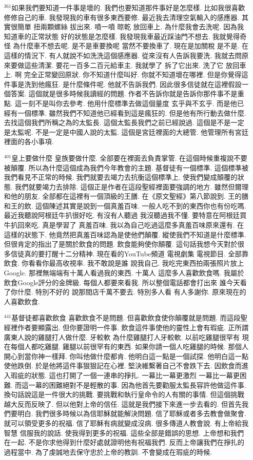 \documentclass{book}
\begin{document}
$^{361}$如果我們要知道一件事是壞的.
我們也要知道那件事好是怎麼樣.
比如我很喜歡修修自己的車.
我發現我的車有很多東西要修.
最近我去清理空氣輸入的感應器.
其實很簡單 扭兩顆螺絲 拔出來.
噴一噴 晾乾 放回車上.
為什麼我會去洗呢.
因為我知道車的正常狀態 好的狀態是怎麼樣.
我發現我車最近踩油門不想去.
我就覺得奇怪 為什麼車不想去呢.
是不是車要換呢 當然不要換車了.
現在是加關稅 是不是.
在這樣的情況下.
有人就說不如洗洗這個感應器.
從來沒有人告訴我要洗.
我就去問原來要做這些清潔.
要花一百多二百元給車主.
我就學了 拆了它出來.
洗了它 放回車上.
啊 完全正常變回原狀.
你不知道什麼叫好.
你就不知道壞在哪裡.
但是你覺得這件事是洗到他瘋狂.
是什麼條件呢.
他就不告訴我們.
因此很多信徒就在這裡假設一個答案.
這個就是很多時候我讀經的問題.
作者不告訴你就是告訴你那件事不是重點.
這一刻不是叫你去參考.
他用什麼標準去做這個量度 玄乎與不玄乎.
而是他已經有一個標準.
雖然我們不知道他已經看到這是瘋狂的.
但是他有所行動去做什麼.
去找這個我們所稱之為的太監長.
這個太監長我們之前已經說過.
這個是不是一定是太監呢.
不是一定是中國人說的太監.
這個是宮廷裡面的大總管.
他管理所有宮廷裡面的各小事項.

$^{401}$皇上要做什麼 皇族要做什麼.
全部要在裡面去負責掌管.
在這個時候重複說不要被顛覆.
所以為什麼這個成為我們今年教會的主題.
基督徒有一個標準.
這個標準被我們看見不正常的時候.
我們就要去竭力去抗衡這個標準上.
使我們變成顛覆的狀態.
我們就要竭力去排除.
這個正是作者在這段聖經裡面要強調的地方.
雖然但爾理和他的朋友.
全部都在這裡有一個頂級的王膳.
在《原文聖經》第八節說到.
王的膳和王的飲.
這個陳述其實是說到一個真羞百味.
一般人吃不到的東西你也有份吃嗎.
最近我聽說阿根廷牛扒很好吃.
有沒有人聽過 我沒聽過我不懂.
要特意在阿根廷買牛扒回來吃.
真是學習了 真羞百味.
我以為自己吃過這麼多真羞百味原來還有.
在這樣的狀態下.
他竟然把真羞百味認為是使他們顛覆.
縱使我們不知道是什麼標準.
但很肯定的指出了是關於飲食的問題.
飲食能夠使你顛覆.
這句話我想今天對於很多信徒真的要打醒十二分精神.
現在看的YouTube頻道 電視劇集 電視節目.
全部靠飲食.
你看看你最高收視率.
我不敢說是誰 說我自己.
我吃完東西拍兩張照片放上Google.
那裡無端端有十萬人看過我的東西.
十萬人 這麼多人喜歡飲食嗎.
我屬於飲食Google評分的金牌級.
每個人都要來看我.
所以整個電話都會打出來 誰今天看了你什麼.
特別不好的 說那間店千萬不要去.
特別多人看 有人多謝你.
原來現在的人喜歡飲食.

$^{441}$基督徒都喜歡飲食 喜歡飲食不是問題.
但喜歡飲食使你顛覆就是問題.
而這段聖經裡作者要顯露出.
但你要證明一件事.
飲食這件事使他的靈性上會有瑕疵.
正所謂廣東人說的雞腿打人做什麼.
牙較軟 為什麼雞腿打人牙較軟.
以前吃雞腿很罕有 現在每個人都吃雞腿.
雞腿以前很罕有的東西.
如果你請一個人吃雞腿的時候.
那個人開心到當你神一樣拜.
你叫他做什麼都肯.
他明白這一點是一個試探.
他明白這一點使他跌倒.
於是他將這件事狠狠記在心裡.
堅決維繫著自己不會跌下去.
因飲食而進入瑕疵的狀態.
這也打開了一個一連串的掙扎.
一幕比一幕更激烈 一幕比一幕更困難.
而這一幕的困難絕對不是輕散的事.
因為他首先要勸服太監長容許他做這件事.
換句話說這是一件很大的挑戰.
要挑戰和執行皇命令的人有關的事情.
但這個挑戰越大反而反映了.
但以他對上帝的信任.
這就是我們接下來進一步去看的.
但首先我們要明白.
我們很多時候以為信耶穌就能解決問題.
信了耶穌或者多去教會做聚會.
就可以領受更多的祝福.
信了耶穌有病就變成沒病.
很多傳道人教會說.
有上帝給我智慧 信服我的說話.
使我得到更多的祝福.
這些全部是錯誤的思想.
上帝想和我們在一起.
不是你求他得到什麼好處就證明他有祝福我們.
反而上帝讓我們在掙扎的過程當中.
為了虔誠地去保守忠於上帝的教訓.
不會變成在瑕疵的時候.
\end{document}
